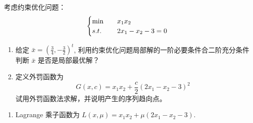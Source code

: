 \begin{example}
    考虑约束优化问题：
    \[
        \begin{cases}
            \min \quad &x_1x_2\\
            s.t. \quad &2x_1 - x_2 - 3 = 0
        \end{cases}
    \]
    \begin{enumerate}
        \item 给定 $\bar{x} = \left(\frac{3}{4}, -\frac{3}{2}\right)^t$, 利用约束优化问题局部解的一阶必要条件合二阶充分条件判断 $\bar{x}$ 是否是局部最优解？
        \item 定义外罚函数为
        \[
            G(x, c) = x_1x_2 + \dfrac{c}{2}\left(2x_1 - x_2 - 3\right)^2
        \]
        试用外罚函数法求解，并说明产生的序列趋向点。
    \end{enumerate}

    \answer \text{}
    \begin{enumerate}
        \item Lagrange 乘子函数为 $L(x, \mu) = x_1x_2 + \mu(2x_1 - x_2 - 3)$.
        

\end{enumerate}
\end{example}
